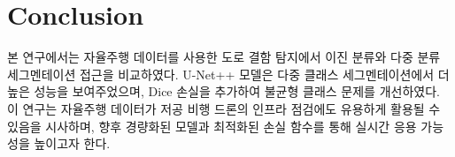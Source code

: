\section{Conclusion}

본 연구에서는 자율주행 데이터를 사용한 도로 결함 탐지에서 이진 분류와 다중 분류 세그멘테이션 접근을 비교하였다. U-Net++ 모델은 다중 클래스 세그멘테이션에서 더 높은 성능을 보여주었으며, Dice 손실을 추가하여 불균형 클래스 문제를 개선하였다. 이 연구는 자율주행 데이터가 저공 비행 드론의 인프라 점검에도 유용하게 활용될 수 있음을 시사하며, 향후 경량화된 모델과 최적화된 손실 함수를 통해 실시간 응용 가능성을 높이고자 한다.

